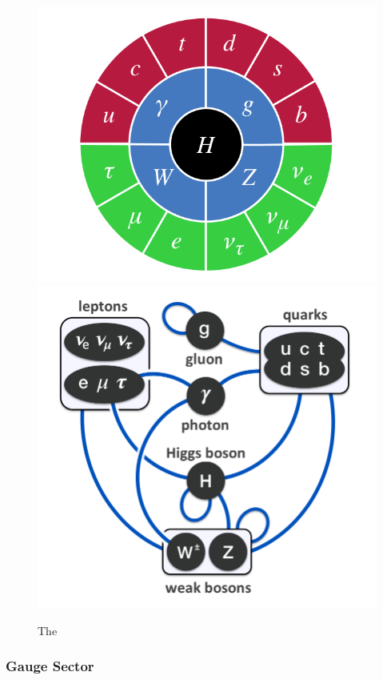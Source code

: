 \begin{figure}
\begin{center}
\includegraphics[width=.45\textwidth]{pics/sm_model_particles}
\includegraphics[width=.45\textwidth]{pics/principal_interactions}
\caption{The }
\end{center}
\end{figure}





\subsubsection{Gauge Sector}

